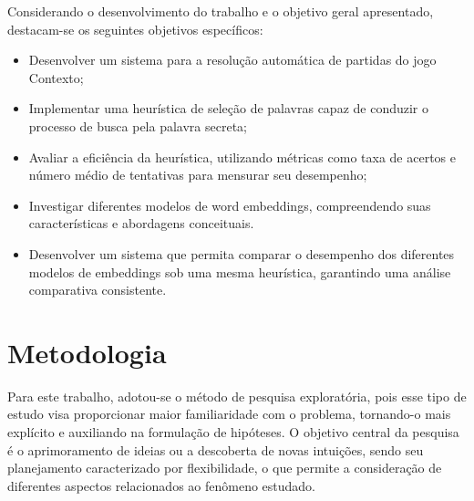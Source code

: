 Considerando o desenvolvimento do trabalho e o objetivo geral apresentado, destacam-se os seguintes objetivos específicos:


\begin{itemize}
    \item Desenvolver um sistema para a resolução automática de partidas do jogo Contexto;
    \item Implementar uma heurística de seleção de palavras capaz de conduzir o processo de busca pela palavra secreta;
    \item Avaliar a eficiência da heurística, utilizando métricas como taxa de acertos e número médio de tentativas para mensurar seu desempenho;
    \item Investigar diferentes modelos de word embeddings, compreendendo suas características e abordagens conceituais.
    \item Desenvolver um sistema que permita comparar o desempenho dos diferentes modelos de embeddings sob uma mesma heurística, garantindo uma análise comparativa consistente.
\end{itemize}

\section{Metodologia}

Para este trabalho, adotou-se o método de pesquisa exploratória, pois esse tipo de estudo visa proporcionar maior familiaridade com o problema, tornando-o mais explícito e auxiliando na formulação de hipóteses. O objetivo central da pesquisa é o aprimoramento de ideias ou a descoberta de novas intuições, sendo seu planejamento caracterizado por flexibilidade, o que permite a consideração de diferentes aspectos relacionados ao fenômeno estudado.

